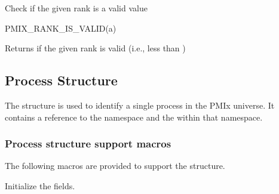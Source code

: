 
Check if the given rank is a valid value

\cspecificstart
\begin{codepar}
PMIX_RANK_IS_VALID(a)
\end{codepar}
\cspecificend

\begin{arglist}
\end{arglist}

Returns  if the given rank is valid (i.e., less than )

\subsection{Process Structure}

The  structure is used to identify a single process in the PMIx universe.
It contains a reference to the namespace and the  within that namespace.


\subsubsection{Process structure support macros}
The following macros are provided to support the  structure.


Initialize the  fields.


\begin{arglist}
\end{arglist}


